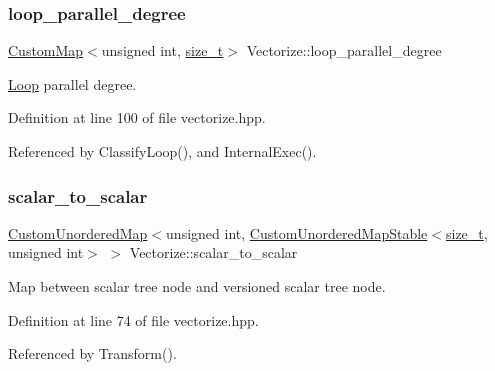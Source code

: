 \subsubsection{\texorpdfstring{loop\+\_\+parallel\+\_\+degree}{loop\_parallel\_degree}}
{\footnotesize\ttfamily \hyperlink{custom__map_8hpp_a18ca01763abbe3e5623223bfe5aaac6b}{Custom\+Map}$<$unsigned int, \hyperlink{tutorial__fpt__2017_2intro_2sixth_2test_8c_a7c94ea6f8948649f8d181ae55911eeaf}{size\+\_\+t}$>$ Vectorize\+::loop\+\_\+parallel\+\_\+degree\hspace{0.3cm}{\ttfamily [private]}}



\hyperlink{classLoop}{Loop} parallel degree. 



Definition at line 100 of file vectorize.\+hpp.



Referenced by Classify\+Loop(), and Internal\+Exec().

\mbox{\label{classVectorize_ac7ee428043e0e6f75f68a3798d01b9f5}} 
\subsubsection{\texorpdfstring{scalar\+\_\+to\+\_\+scalar}{scalar\_to\_scalar}}
{\footnotesize\ttfamily \hyperlink{custom__map_8hpp_ad1ed68f2ff093683ab1a33522b144adc}{Custom\+Unordered\+Map}$<$unsigned int, \hyperlink{custom__map_8hpp_a7314a7df1cdb3a3acf478ab86e95c226}{Custom\+Unordered\+Map\+Stable}$<$\hyperlink{tutorial__fpt__2017_2intro_2sixth_2test_8c_a7c94ea6f8948649f8d181ae55911eeaf}{size\+\_\+t}, unsigned int$>$ $>$ Vectorize\+::scalar\+\_\+to\+\_\+scalar\hspace{0.3cm}{\ttfamily [private]}}



Map between scalar tree node and versioned scalar tree node. 



Definition at line 74 of file vectorize.\+hpp.



Referenced by Transform().

\mbox{\label{classVectorize_a16af9f9417f7b35c9f8e5f1e9921dade}} 
